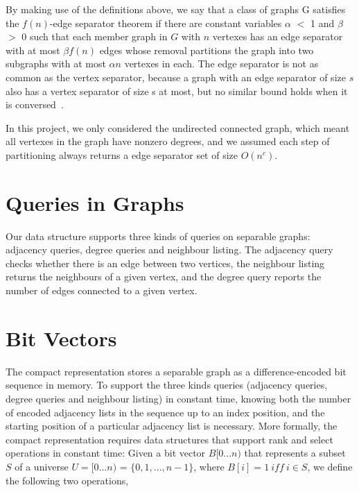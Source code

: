 \documentclass[12pt,glossary]{dalthesis}
\begin{document}
\bigskip
\bigskip

By making use of the definitions above, we say that a class of graphs G satisfies the $f(n)$-edge separator theorem if there are constant variables $\alpha$ $<$ 1 and $\beta$ $>$ 0 such that each member graph in $G$ with $n$ vertexes has an edge separator with at most $\beta f(n)$ edges whose removal partitions the graph into two subgraphs with at most $\alpha n$ vertexes in each. The edge separator is not as common as the vertex separator, because a graph with an edge separator of size $s$ also has a vertex separator of size s at most, but no similar bound holds when it is conversed~\cite{compact-representation}.

\bigskip
\bigskip

In this project, we only considered the undirected connected graph, which meant all vertexes in the graph have nonzero degrees, and we assumed each step of partitioning always returns a edge separator set of size $O(n^{c})$.

\bigskip
\bigskip

\section{Queries in Graphs}
Our data structure supports three kinds of queries on separable graphs: adjacency queries, degree queries and neighbour listing. The adjacency query checks whether there is an edge between two vertices, the neighbour listing returns the neighbours of a given vertex, and the degree query reports the number of edges connected to a given vertex.

\bigskip
\bigskip

\section{Bit Vectors}
The compact representation stores a separable graph as a difference-encoded bit sequence in memory. To support the three kinds queries (adjacency queries, degree queries and neighbour listing) in constant time, knowing both the number of encoded adjacency lists in the sequence up to an index position, and the starting position of a particular adjacency list is necessary. More formally, the compact representation requires data structures that support rank and select operations in constant time: Given a bit vector $B[0...n)$ that represents a subset $S$ of a universe $U = [0...n)$ = $\{0,1,...,n-1 \}$, where $B[i] = 1 \ iff \ i \in S$, we define the following two operations, 
\end{document}
